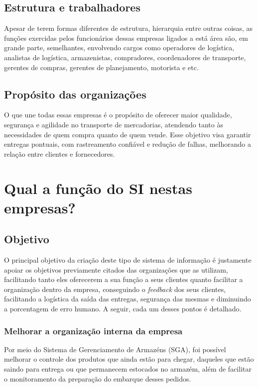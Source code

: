 \documentclass[conference]{IEEEtran}
\begin{document}
\subsection{Estrutura e trabalhadores}
Apesar de terem formas diferentes de estrutura, hierarquia entre outras coisas, as funções exercidas pelos funcionários dessas empresas ligados a está área são, em grande parte, semelhantes, envolvendo cargos como operadores de logística, analistas de logística, armazenistas, compradores, coordenadores de transporte, gerentes de compras, gerentes de planejamento, motorista e etc\cite{cargos}. 

\subsection{Propósito das organizações}
O que une todas essas empresas é o propósito de oferecer maior qualidade, segurança e agilidade no transporte de mercadorias, atendendo tanto às necessidades de quem compra quanto de quem vende. Esse objetivo visa garantir entregas pontuais, com rastreamento confiável e redução de falhas, melhorando a relação entre clientes e fornecedores.

\section{Qual a função do SI nestas empresas?}
\subsection{Objetivo}

O principal objetivo da criação deste tipo de sistema de informação é justamente apoiar os objetivos previamente citados das organizações que as utilizam, facilitando tanto eles oferecerem a sua função a seus clientes quanto facilitar a organização dentro da empresa, conseguindo o \textit{feedback} dos seus clientes, facilitando a logística da saída das entregas, segurança das mesmas e diminuindo a porcentagem de erro humano. A seguir, cada um desses pontos é detalhado\cite{silogistica}.

\subsubsection{Melhorar a organização interna da empresa}
Por meio do Sistema de Gerenciamento de Armazéns (SGA), foi possível melhorar o controle dos produtos que ainda estão para chegar, daqueles que estão saindo para entrega ou que permanecem estocados no armazém, além de facilitar o monitoramento da preparação do embarque desses pedidos.
\end{document}
